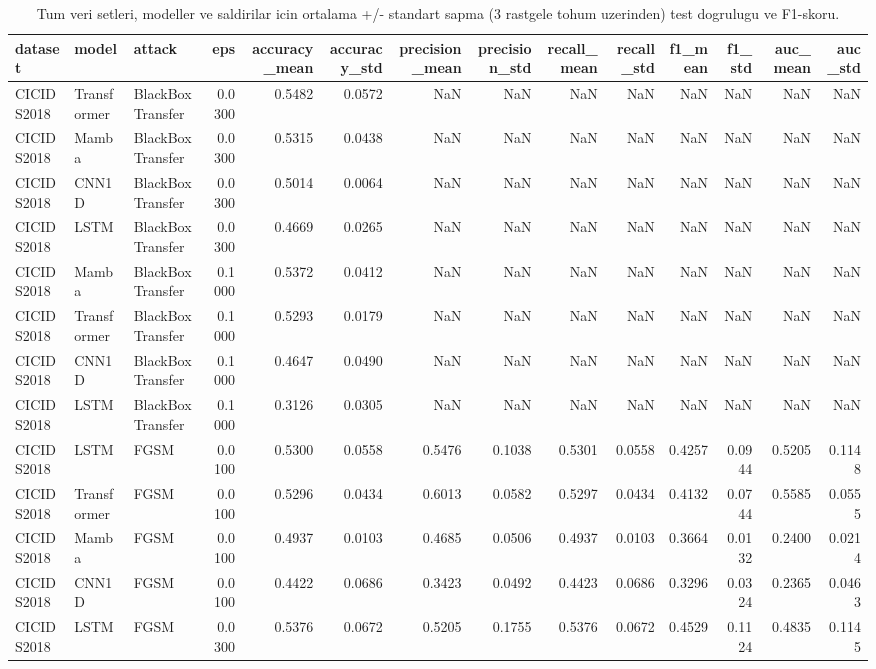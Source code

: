 \begin{table}[ht]
\centering
\caption{Tum veri setleri, modeller ve saldirilar icin ortalama +/- standart sapma (3 rastgele tohum uzerinden) test dogrulugu ve F1-skoru.}
\label{tab:T1_ana_ozet_sonuclari}
\begin{tabular}{lllrrrrrrrrrrr}
\toprule
dataset & model & attack & eps & accuracy\_mean & accuracy\_std & precision\_mean & precision\_std & recall\_mean & recall\_std & f1\_mean & f1\_std & auc\_mean & auc\_std \\
\midrule
CICIDS2018 & Transformer & BlackBoxTransfer & 0.0300 & 0.5482 & 0.0572 & NaN & NaN & NaN & NaN & NaN & NaN & NaN & NaN \\
CICIDS2018 & Mamba & BlackBoxTransfer & 0.0300 & 0.5315 & 0.0438 & NaN & NaN & NaN & NaN & NaN & NaN & NaN & NaN \\
CICIDS2018 & CNN1D & BlackBoxTransfer & 0.0300 & 0.5014 & 0.0064 & NaN & NaN & NaN & NaN & NaN & NaN & NaN & NaN \\
CICIDS2018 & LSTM & BlackBoxTransfer & 0.0300 & 0.4669 & 0.0265 & NaN & NaN & NaN & NaN & NaN & NaN & NaN & NaN \\
CICIDS2018 & Mamba & BlackBoxTransfer & 0.1000 & 0.5372 & 0.0412 & NaN & NaN & NaN & NaN & NaN & NaN & NaN & NaN \\
CICIDS2018 & Transformer & BlackBoxTransfer & 0.1000 & 0.5293 & 0.0179 & NaN & NaN & NaN & NaN & NaN & NaN & NaN & NaN \\
CICIDS2018 & CNN1D & BlackBoxTransfer & 0.1000 & 0.4647 & 0.0490 & NaN & NaN & NaN & NaN & NaN & NaN & NaN & NaN \\
CICIDS2018 & LSTM & BlackBoxTransfer & 0.1000 & 0.3126 & 0.0305 & NaN & NaN & NaN & NaN & NaN & NaN & NaN & NaN \\
CICIDS2018 & LSTM & FGSM & 0.0100 & 0.5300 & 0.0558 & 0.5476 & 0.1038 & 0.5301 & 0.0558 & 0.4257 & 0.0944 & 0.5205 & 0.1148 \\
CICIDS2018 & Transformer & FGSM & 0.0100 & 0.5296 & 0.0434 & 0.6013 & 0.0582 & 0.5297 & 0.0434 & 0.4132 & 0.0744 & 0.5585 & 0.0555 \\
CICIDS2018 & Mamba & FGSM & 0.0100 & 0.4937 & 0.0103 & 0.4685 & 0.0506 & 0.4937 & 0.0103 & 0.3664 & 0.0132 & 0.2400 & 0.0214 \\
CICIDS2018 & CNN1D & FGSM & 0.0100 & 0.4422 & 0.0686 & 0.3423 & 0.0492 & 0.4423 & 0.0686 & 0.3296 & 0.0324 & 0.2365 & 0.0463 \\
CICIDS2018 & LSTM & FGSM & 0.0300 & 0.5376 & 0.0672 & 0.5205 & 0.1755 & 0.5376 & 0.0672 & 0.4529 & 0.1124 & 0.4835 & 0.1145 \\

\end{tabular}
\end{table}
